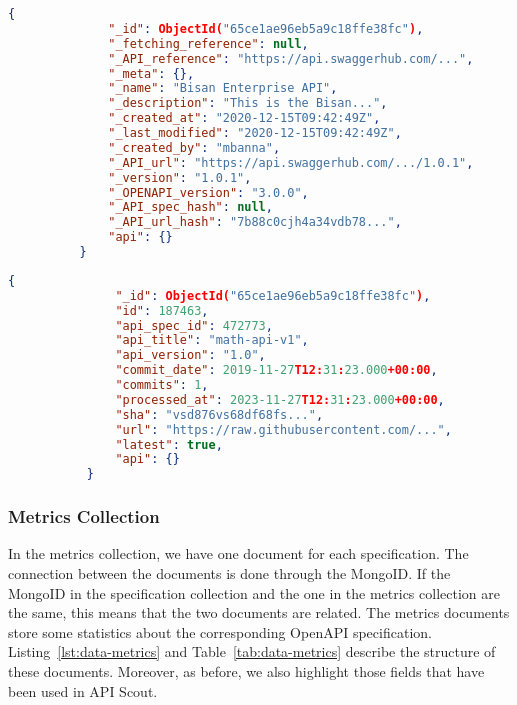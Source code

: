 \begin{lstlisting}[label={lst:data-swaggerhub},language=json,caption={Structure of the data coming from SwaggerHub},captionpos=b]
          {
              "_id": ObjectId("65ce1ae96eb5a9c18ffe38fc"),
              "_fetching_reference": null,
              "_API_reference": "https://api.swaggerhub.com/...",
              "_meta": {},
              "_name": "Bisan Enterprise API",
              "_description": "This is the Bisan...",
              "_created_at": "2020-12-15T09:42:49Z",
              "_last_modified": "2020-12-15T09:42:49Z",
              "_created_by": "mbanna",
              "_API_url": "https://api.swaggerhub.com/.../1.0.1",
              "_version": "1.0.1",
              "_OPENAPI_version": "3.0.0",
              "_API_spec_hash": null,
              "_API_url_hash": "7b88c0cjh4a34vdb78...",
              "api": {}
          }
\end{lstlisting}

\begin{lstlisting}[label={lst:data-github},language=json,caption={Structure of the data coming from GitHub},captionpos=b]
           {
               "_id": ObjectId("65ce1ae96eb5a9c18ffe38fc"),
               "id": 187463,
               "api_spec_id": 472773,
               "api_title": "math-api-v1",
               "api_version": "1.0",
               "commit_date": 2019-11-27T12:31:23.000+00:00,
               "commits": 1,
               "processed_at": 2023-11-27T12:31:23.000+00:00,
               "sha": "vsd876vs68df68fs...",
               "url": "https://raw.githubusercontent.com/...",
               "latest": true,
               "api": {}
           }
\end{lstlisting}

\subsubsection{Metrics Collection}
In the metrics collection, we have one document for each specification.
The connection between the documents is done through the MongoID. If the MongoID in the specification collection and the one in the metrics collection are the same, this means that the two documents are related.
The metrics documents store some statistics about the corresponding OpenAPI specification.
Listing~\ref{lst:data-metrics} and Table~\ref{tab:data-metrics} describe the structure of these documents.
Moreover, as before, we also highlight those fields that have been used in API Scout.

